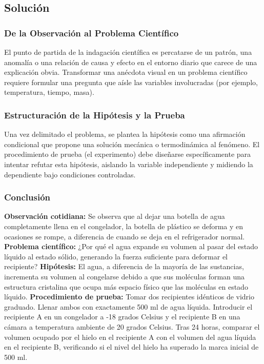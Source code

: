 \documentclass[12pt, a4paper]{article}
\begin{document}
\subsection*{Solución}

\subsubsection*{De la Observación al Problema Científico}
El punto de partida de la indagación científica es percatarse de un patrón, una anomalía o una relación de causa y efecto en el entorno diario que carece de una explicación obvia. Transformar una anécdota visual en un problema científico requiere formular una pregunta que aísle las variables involucradas (por ejemplo, temperatura, tiempo, masa). 

\subsubsection*{Estructuración de la Hipótesis y la Prueba}
Una vez delimitado el problema, se plantea la hipótesis como una afirmación condicional que propone una solución mecánica o termodinámica al fenómeno. El procedimiento de prueba (el experimento) debe diseñarse específicamente para intentar refutar esta hipótesis, aislando la variable independiente y midiendo la dependiente bajo condiciones controladas.

\subsubsection*{Conclusión}
\textbf{Observación cotidiana:} Se observa que al dejar una botella de agua completamente llena en el congelador, la botella de plástico se deforma y en ocasiones se rompe, a diferencia de cuando se deja en el refrigerador normal.
\newline\newline
\textbf{Problema científico:} ¿Por qué el agua expande su volumen al pasar del estado líquido al estado sólido, generando la fuerza suficiente para deformar el recipiente?
\newline\newline
\textbf{Hipótesis:} El agua, a diferencia de la mayoría de las sustancias, incrementa su volumen al congelarse debido a que sus moléculas forman una estructura cristalina que ocupa más espacio físico que las moléculas en estado líquido.
\newline\newline
\textbf{Procedimiento de prueba:} Tomar dos recipientes idénticos de vidrio graduado. Llenar ambos con exactamente 500 ml de agua líquida. Introducir el recipiente A en un congelador a -18 grados Celsius y el recipiente B en una cámara a temperatura ambiente de 20 grados Celsius. Tras 24 horas, comparar el volumen ocupado por el hielo en el recipiente A con el volumen del agua líquida en el recipiente B, verificando si el nivel del hielo ha superado la marca inicial de 500 ml.
\end{document}
